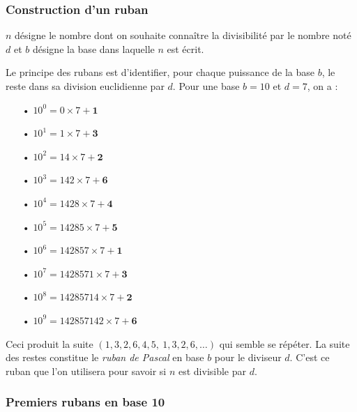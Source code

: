 \documentclass[a4paper, twoside]{article}
\begin{document}
	\subsubsection*{Construction d’un ruban}\label{construct_ruban}
		$n$ désigne le nombre dont on souhaite connaître la divisibilité par le nombre noté $d$ et $b$ désigne la base dans laquelle $n$ est écrit. 
		
		Le principe des rubans est d'identifier, pour chaque puissance de la base $b$, le reste dans sa division euclidienne par $d$. Pour une base $b = 10$ et $d = 7$, on a :\\
		
	\vspace{-3 mm}

	\begin{itemize}

		\item[•] $10^0 = 0 \times 7 + \mathbf{1}$
		\item[•] $10^1 = 1 \times 7 + \mathbf{3}$
		\item[•] $10^2 = 14 \times 7 + \mathbf{2}$
		\item[•] $10^3 = 142 \times 7 + \mathbf{6}$
		\item[•] $10^4 = {1428} \times 7 + \mathbf{4}$
		\item[•] $10^5 = {14285} \times 7 + \mathbf{5}$
		\item[•] $10^6 = {142857} \times 7 + \mathbf{1}$
		\item[•] $10^7 = {1428571} \times 7 + \mathbf{3}$
		\item[•] $10^8 = {14285714} \times 7 + \mathbf{2}$
		\item[•] $10^9 = {142857142} \times 7 + \mathbf{6}$
		
	\end{itemize}

	\vspace{1 mm}

		Ceci produit la suite $(1,3,2,6,4,5,~1,3,2,6,\dots)$ qui semble se répéter. La suite des restes constitue le \textit{ruban de Pascal} en base $b$ pour le diviseur $d$. C'est ce ruban que l'on utilisera pour savoir si $n$ est divisible par $d$. 

	\vfill



	\subsubsection*{Premiers rubans en base 10}\label{ruban_base_10}
\end{document}

